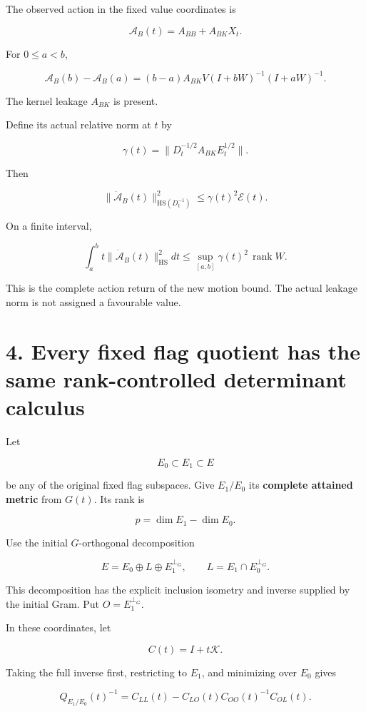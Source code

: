 \documentclass[11pt]{article}
\begin{document}
The observed action in the fixed value coordinates is

\[
\mathcal A_B(t)=A_{BB}+A_{BK}X_t.
\]

For \(0\le a<b\),

\[
\boxed{
\mathcal A_B(b)-\mathcal A_B(a)
=
(b-a)A_{BK}V(I+bW)^{-1}(I+aW)^{-1}.
}
\tag{28}
\]

The kernel leakage \(A_{BK}\) is present.

Define its actual relative norm at \(t\) by

\[
\gamma(t)=
\|D_t^{-1/2}A_{BK}E_t^{1/2}\|.
\]

Then

\[
\boxed{
\|\dot{\mathcal A}_B(t)\|_{\mathrm{HS}(D_t^{-1})}^{2}
\le\gamma(t)^2\mathcal E(t).
}
\tag{29}
\]

On a finite interval,

\[
\int_a^b t\|\dot{\mathcal A}_B(t)\|_{\mathrm{HS}}^2dt
\le
\sup_{[a,b]}\gamma(t)^2\,\operatorname{rank}W.
\]

This is the complete action return of the new motion bound. The actual leakage norm is not assigned a favourable value.

\section{4. Every fixed flag quotient has the same rank-controlled determinant calculus}\label{every-fixed-flag-quotient-has-the-same-rank-controlled-determinant-calculus}

Let

\[
E_0\subset E_1\subset E
\]

be any of the original fixed flag subspaces. Give \(E_1/E_0\) its \textbf{complete attained metric} from \(G(t)\). Its rank is

\[
p=\dim E_1-\dim E_0.
\]

Use the initial \(G\)-orthogonal decomposition

\[
E=E_0\oplus L\oplus E_1^{\perp_G},
\qquad
L=E_1\cap E_0^{\perp_G}.
\]

This decomposition has the explicit inclusion isometry and inverse supplied by the initial Gram. Put \(O=E_1^{\perp_G}\).

In these coordinates, let

\[
C(t)=I+t\mathcal K.
\]

Taking the full inverse first, restricting to \(E_1\), and minimizing over \(E_0\) gives

\[
\boxed{
Q_{E_1/E_0}(t)^{-1}
=
C_{LL}(t)-C_{LO}(t)C_{OO}(t)^{-1}C_{OL}(t).
}
\tag{30}
\]
\end{document}
